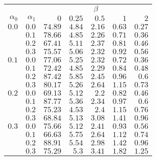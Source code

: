 \begin{tabular}{rr|rrrrr}
\hline\hline
 && \multicolumn{5}{c}{$\beta$}\\
 $\alpha_0$ & $\alpha_1$ & $0$ & $0.25$ & $0.5$ & $1$ & $2$ \\ 
 \hline
$0.0$ & $0.0$ & $74.89$ & $4.84$ & $2.16$ & $0.63$ & $0.27$\\ 
 & $0.1$ & $78.66$ & $4.85$ & $2.26$ & $0.71$ & $0.36$\\ 
 & $0.2$ & $67.41$ & $5.11$ & $2.37$ & $0.81$ & $0.46$\\ 
 & $0.3$ & $75.57$ & $5.06$ & $2.32$ & $0.92$ & $0.56$\\ 
\hline 
 $0.1$ & $0.0$ & $77.06$ & $5.25$ & $2.32$ & $0.72$ & $0.36$\\ 
 & $0.1$ & $72.42$ & $4.85$ & $2.29$ & $0.84$ & $0.48$\\ 
 & $0.2$ & $87.42$ & $5.85$ & $2.45$ & $0.96$ & $0.6$\\ 
 & $0.3$ & $80.17$ & $5.26$ & $2.64$ & $1.15$ & $0.73$\\ 
\hline 
 $0.2$ & $0.0$ & $69.13$ & $5.12$ & $2.2$ & $0.82$ & $0.46$\\ 
 & $0.1$ & $87.77$ & $5.36$ & $2.34$ & $0.97$ & $0.6$\\ 
 & $0.2$ & $75.23$ & $4.53$ & $2.4$ & $1.15$ & $0.76$\\ 
 & $0.3$ & $68.84$ & $5.13$ & $3.08$ & $1.41$ & $0.96$\\ 
\hline 
 $0.3$ & $0.0$ & $75.66$ & $5.12$ & $2.41$ & $0.93$ & $0.56$\\ 
 & $0.1$ & $66.63$ & $5.75$ & $2.64$ & $1.12$ & $0.74$\\ 
 & $0.2$ & $88.91$ & $5.54$ & $2.98$ & $1.42$ & $0.96$\\ 
 & $0.3$ & $75.29$ & $5.3$ & $3.41$ & $1.82$ & $1.25$\\ 
 \hline 
 \end{tabular}